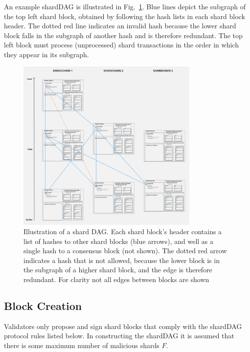 An example shardDAG is illustrated in Fig.~\ref{figure:shard-formation}. 
Blue lines depict the subgraph of the top left shard block, obtained by following the hash lists in each shard block header. 
The dotted red line indicates an invalid hash because the lower shard block falls in the subgraph of another hash and is therefore redundant.
The top left block must process (unprocessed) shard transactions in the order in which they appear in its subgraph.

\begin{figure}
	\centering
	\includegraphics[width=0.8\textwidth]{figures/DetailedShardDAGEdgeRules.jpg}
	\caption{ Illustration of a shard DAG. 
		Each shard block’s header contains a list of hashes to other shard blocks (blue arrows), and well as a single hash to a consensus block (not shown). 
		The dotted red arrow indicates a hash that is not allowed, because the lower block is in the subgraph of a higher shard block, and the edge is therefore redundant. 
		For clarity not all edges between blocks are shown}
	\label{figure:shard-formation}
\end{figure}




\subsection{Block Creation}

Validators only propose and sign shard blocks that comply with the shardDAG protocol rules listed below. 
In constructing the shardDAG it is assumed that there is some maximum number of malicious shards $F$. 


